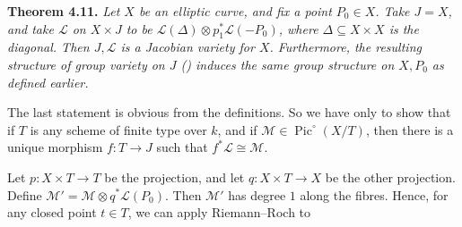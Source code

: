 {\medskip
\noindent\hypertarget{result-IV-4.11}{}\textbf{Theorem 4.11.} \emph{Let $X$ be an elliptic curve, and fix a point $P_0\in X$. Take $J=X$, and take $\mathcal L$ on $X\times J$ to be $\mathcal L(\Delta)\otimes p_1^*\mathcal L(-P_0)$, where $\Delta\subseteq X\times X$ is the diagonal. Then $J,\mathcal L$ is a Jacobian variety for $X$. Furthermore, the resulting structure of group variety on $J$ \textup{()} induces the same group structure on $X,P_0$ as defined earlier.}

\Proof The last statement is obvious from the definitions. So we have only to show that if $T$ is any scheme of finite type over $k$, and if $\mathcal M\in\operatorname{Pic}^{\circ}(X/T)$, then there is a unique morphism $f\colon T\to J$ such that $f^*\mathcal L\cong\mathcal M$.

Let $p\colon X\times T\to T$ be the projection, and let $q\colon X\times T\to X$ be the other projection. Define $\mathcal M'=\mathcal M\otimes q^*\mathcal L(P_0)$. Then $\mathcal M'$ has degree $1$ along the fibres. Hence, for any closed point $t\in T$, we can apply Riemann--Roch to
}
